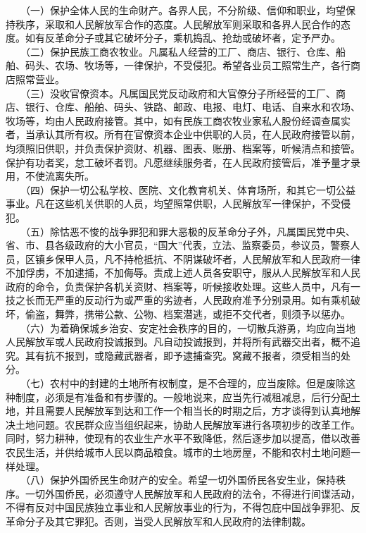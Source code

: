\documentclass[cn,11pt,chinese]{elegantbook}
\begin{document}
　　（一）保护全体人民的生命财产。各界人民，不分阶级、信仰和职业，均望保持秩序，采取和人民解放军合作的态度。人民解放军则采取和各界人民合作的态度。如有反革命分子或其它破坏分子，乘机捣乱、抢劫或破坏者，定予严办。\\
　　（二）保护民族工商农牧业。凡属私人经营的工厂、商店、银行、仓库、船舶、码头、农场、牧场等，一律保护，不受侵犯。希望各业员工照常生产，各行商店照常营业。\\
　　（三）没收官僚资本。凡属国民党反动政府和大官僚分子所经营的工厂、商店、银行、仓库、船舶、码头、铁路、邮政、电报、电灯、电话、自来水和农场、牧场等，均由人民政府接管。其中，如有民族工商农牧业家私人股份经调查属实者，当承认其所有权。所有在官僚资本企业中供职的人员，在人民政府接管以前，均须照旧供职，并负责保护资财、机器、图表、账册、档案等，听候清点和接管。保护有功者奖，怠工破坏者罚。凡愿继续服务者，在人民政府接管后，准予量才录用，不使流离失所。\\
　　（四）保护一切公私学校、医院、文化教育机关、体育场所，和其它一切公益事业。凡在这些机关供职的人员，均望照常供职，人民解放军一律保护，不受侵犯。\\
　　（五）除怙恶不悛的战争罪犯和罪大恶极的反革命分子外，凡属国民党中央、省、市、县各级政府的大小官员，“国大”代表，立法、监察委员，参议员，警察人员，区镇乡保甲人员，凡不持枪抵抗、不阴谋破坏者，人民解放军和人民政府一律不加俘虏，不加逮捕，不加侮辱。责成上述人员各安职守，服从人民解放军和人民政府的命令，负责保护各机关资财、档案等，听候接收处理。这些人员中，凡有一技之长而无严重的反动行为或严重的劣迹者，人民政府准予分别录用。如有乘机破坏，偷盗，舞弊，携带公款、公物、档案潜逃，或拒不交代者，则须予以惩办。\\
　　（六）为着确保城乡治安、安定社会秩序的目的，一切散兵游勇，均应向当地人民解放军或人民政府投诚报到。凡自动投诚报到，并将所有武器交出者，概不追究。其有抗不报到，或隐藏武器者，即予逮捕查究。窝藏不报者，须受相当的处分。\\
　　（七）农村中的封建的土地所有权制度，是不合理的，应当废除。但是废除这种制度，必须是有准备和有步骤的。一般地说来，应当先行减租减息，后行分配土地，并且需要人民解放军到达和工作一个相当长的时期之后，方才谈得到认真地解决土地问题。农民群众应当组织起来，协助人民解放军进行各项初步的改革工作。同时，努力耕种，使现有的农业生产水平不致降低，然后逐步加以提高，借以改善农民生活，并供给城市人民以商品粮食。城市的土地房屋，不能和农村土地问题一样处理。\\
　　（八）保护外国侨民生命财产的安全。希望一切外国侨民各安生业，保持秩序。一切外国侨民，必须遵守人民解放军和人民政府的法令，不得进行间谍活动，不得有反对中国民族独立事业和人民解放事业的行为，不得包庇中国战争罪犯、反革命分子及其它罪犯。否则，当受人民解放军和人民政府的法律制裁。\\
\end{document}
